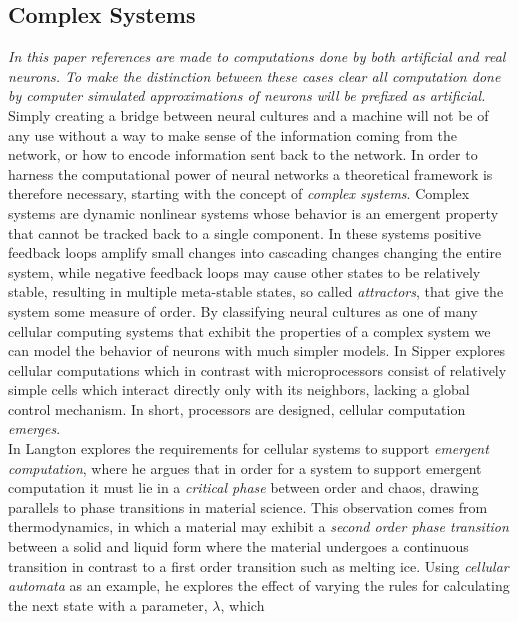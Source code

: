 \subsection{Complex Systems}
\textit{
  In this paper references are made to computations done by both artificial and real
  neurons.
  To make the distinction between these cases clear all computation done by
  computer simulated approximations of neurons will be prefixed as artificial.
}\\
Simply creating a bridge between neural cultures and a machine will not be of any
use without a way to make sense of the information coming from the
network, or how to encode information sent back to the network.
In order to harness the computational power of neural networks a theoretical
framework is therefore necessary, starting with the concept of \textit{complex
 systems}.
Complex systems are dynamic nonlinear systems whose behavior is an emergent
property that cannot be tracked back to a single component.
In these systems positive feedback loops amplify small changes into cascading
changes changing the entire system, while negative feedback loops may cause
other states to be relatively stable, resulting in multiple meta-stable states,
so called \textit{attractors}, that give the system some measure of order.
By classifying neural cultures as one of many cellular computing systems that
exhibit the properties of a complex system we can model the behavior of neurons
with much simpler models.
In \cite{sipper_emergence_1999} Sipper explores cellular computations which
in contrast with microprocessors consist of relatively simple cells which
interact directly only with its neighbors, lacking a global control mechanism.
In short, processors are designed, cellular computation \textit{emerges}.\\
In \cite{langton_computation_1990} Langton explores the requirements for
cellular systems to support \textit{emergent computation}, where
he argues that in order for a system to support emergent computation it must
lie in a \textit{critical phase} between order and chaos, drawing parallels to
phase transitions in material science.
This observation comes from thermodynamics, in which a material may exhibit a
\textit{second order phase transition} between a solid and liquid form where the
material undergoes a continuous transition in contrast to a first order
transition such as melting ice.
Using \textit{cellular automata} as an example, he explores the effect of varying the
rules for calculating the next state with a parameter, $\lambda$, which
